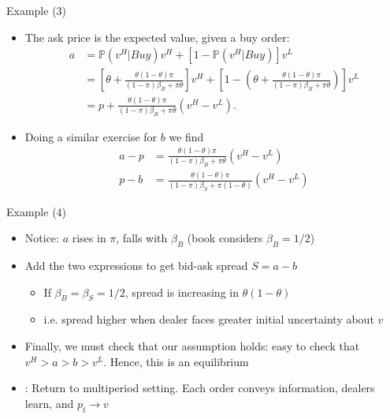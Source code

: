 \begin{frame}{Example (3)}
\begin{itemize}
	\item The ask price is the expected value, given a buy order:
	\begin{align*}
		a 
		& = \mathbb{P}(v^H| Buy) v^H + [1-\mathbb{P}(v^H| Buy)] v^L \\
		& = \left[ \theta + \frac{\theta(1-\theta) \pi}{(1-\pi)\beta_B+\pi\theta} \right] v^H + \left[ 1 - \left( \theta + \frac{\theta(1-\theta) \pi}{(1-\pi)\beta_B+\pi\theta} \right) \right] v^L\\
		& = p + \frac{\theta(1-\theta) \pi}{(1-\pi)\beta_B+\pi\theta} (v^H -v^L).
	\end{align*}
	\item Doing a similar exercise for $b$ we find
	\begin{align*}
		a - p 		&= \frac{\theta(1-\theta) \pi}{(1-\pi)\beta_B+\pi\theta}(v^H-v^L) \\
		p - b 		&= \frac{\theta(1-\theta) \pi}{(1-\pi)\beta_S+\pi(1-\theta)}(v^H-v^L)
	\end{align*}
\end{itemize}
\end{frame}


\begin{frame}[label=example]{Example (4)}
\begin{itemize}
	\item Notice: $a$ rises in $\pi$, falls with $\beta_B$ (book considers $\beta_B=1/2$)
	\item Add the two expressions to get bid-ask spread $S = a-b$
	\begin{itemize}
		\item If $\beta_B=\beta_S=1/2$, spread is increasing in $\theta(1-\theta)$
		\item i.e. spread higher when dealer faces greater initial uncertainty about $v$
	\end{itemize}
	\item Finally, we must check that our assumption holds: easy to check that $v^H > a > b > v^L$. Hence, \alert{this is an equilibrium}
	\item {}: Return to multiperiod setting. Each order conveys information, dealers learn, and 
	\center
	$p_t \rightarrow v$
	\hyperlink{dynamics}{}
\end{itemize}
\end{frame}


